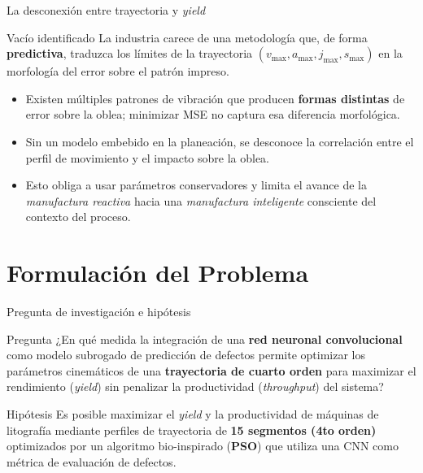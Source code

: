 \documentclass[en,16:9,navbarinline,bigfoot]{sdqbeamer}
\begin{document}
\begin{frame}{La desconexión entre trayectoria y \textit{yield}}
    \begin{redblock}{Vacío identificado}
        La industria carece de una metodología que, de forma \textbf{predictiva}, traduzca los límites de la trayectoria $(v_{\max}, a_{\max}, j_{\max}, s_{\max})$ en la morfología del error sobre el patrón impreso.
    \end{redblock}
    \vspace{0.2cm}
    \begin{itemize}
        \item Existen múltiples patrones de vibración que producen \textbf{formas distintas} de error sobre la oblea; minimizar MSE no captura esa diferencia morfológica.
        \item Sin un modelo embebido en la planeación, se desconoce la correlación entre el perfil de movimiento y el impacto sobre la oblea.
        \item Esto obliga a usar parámetros conservadores y limita el avance de la \emph{manufactura reactiva} hacia una \emph{manufactura inteligente} consciente del contexto del proceso.
    \end{itemize}
\end{frame}

\section{Formulación del Problema}

\begin{frame}{Pregunta de investigación e hipótesis}
    \begin{purpleblock}{Pregunta}
        ¿En qué medida la integración de una \textbf{red neuronal convolucional} como modelo subrogado de predicción de defectos permite optimizar los parámetros cinemáticos de una \textbf{trayectoria de cuarto orden} para maximizar el rendimiento (\textit{yield}) sin penalizar la productividad (\textit{throughput}) del sistema?
    \end{purpleblock}

    \begin{blueblock}{Hipótesis}
        Es posible maximizar el \textit{yield} y la productividad de máquinas de litografía mediante perfiles de trayectoria de \textbf{15 segmentos (4to orden)} optimizados por un algoritmo bio-inspirado (\textbf{PSO}) que utiliza una CNN como métrica de evaluación de defectos.
    \end{blueblock}
\end{frame}
\end{document}
